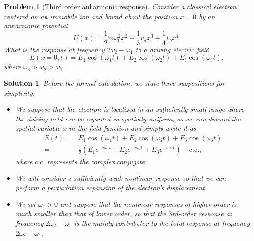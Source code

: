 \documentclass[UTF8,10pt,a4paper]{article}
\theoremstyle{Problem}
\newtheorem{prob}{Problem}
\theoremstyle{Solution}
\newtheorem*{sol}{Solution}
\begin{document}
\thispagestyle{FirstPageStyle}
\begin{prob}[Third order anharmonic response]
    Consider a classical electron centered on an immobile ion and bound about the position $x=0$ by an anharmonic potential
    \[
        U(x)=\frac{1}{2}m\omega_0^2x^2+\frac{1}{3}v_ax^3+\frac{1}{4}v_bx^4.
    \]
    What is the response at frequency $2\omega_2-\omega_1$ to a driving electric field
    \[
        E(x=0,t)=E_1\cos(\omega_1t)+E_2\cos(\omega_2t)+E_3\cos(\omega_3t),
    \]
    where $\omega_3>\omega_2>\omega_1$.
\end{prob}
\begin{sol}
    Before the formal calculation, we state three suppositions for simplicity:
    \begin{itemize}
        \item We suppose that the electron is localized in an sufficiently small range where the driving field can be regarded as spatially uniform, so we can discard the spatial variable $x$ in the field function and simply write it as
              \begin{align}
                  \nonumber E(t)= & E_1\cos(\omega_1t)+E_2\cos(\omega_2t)+E_3\cos(\omega_3t)                                      \\
                  =               & \frac{1}{2}\left(E_1e^{-i\omega_1t}+E_2e^{-i\omega_2t}+E_3e^{-i\omega_3t}\right)+\text{c.c.},
              \end{align}
              where $\text{c.c.}$ represents the complex conjugate.
        \item We will consider a sufficiently weak nonlinear response so that we can perform a perturbation expansion of the electron's displacement.
        \item We set $\omega_1>0$ and suppose that the nonlinear responses of higher order is much smaller than that of lower order, so that the $3$rd-order response at frequency $2\omega_2-\omega_1$ is the mainly contributor to the total response at frequency $2\omega_2-\omega_1$.
    \end{itemize}


\end{sol}
\end{document}
